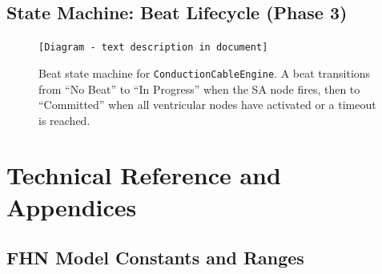 \documentclass[12pt,a4paper,oneside]{book}
\begin{document}
\section{State Machine: Beat Lifecycle (Phase 3)}

\begin{figure}[H]
    \centering
    
    \begin{center}
    \texttt{[Diagram - text description in document]}
    \end{center}
    
    \caption{Beat state machine for \texttt{ConductionCableEngine}. A beat transitions from ``No Beat'' to ``In Progress'' when the SA node fires, then to ``Committed'' when all ventricular nodes have activated or a timeout is reached.}
    \label{fig:beat_state}
\end{figure}

\chapter{Technical Reference and Appendices}

\section{FHN Model Constants and Ranges}
\end{document}
